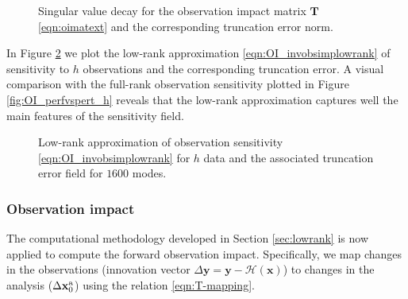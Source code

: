 \documentclass[final,sort&compress]{elsarticle}
\newcommand{\T}{\mathbf{T}}
\newcommand{\x}{   \mathbf{x} }
\newcommand{\xa}{ \mathbf{x}^{\rm a} }
\newcommand{\y}{ \mathbf{y} }
\renewcommand{\H}{\mathcal{H}}
\begin{document}
 \begin{figure}
 \setcounter{subfigure}{0}
  \centering
  \caption{Singular value decay for the observation impact matrix $\T$ \eqref{eqn:oimatext} and the corresponding truncation error norm.}
  \label{fig:lowrank}
 \end{figure}

In Figure \ref{fig:OI_redrank} we plot the low-rank approximation \eqref{eqn:OI_invobsimplowrank} of sensitivity to $h$ observations and the corresponding truncation error.
A visual comparison with the full-rank observation sensitivity plotted in Figure \ref{fig:OI_perfvspert_h} reveals that 
the low-rank approximation captures well the main features of the sensitivity field.

 \begin{figure}
 \setcounter{subfigure}{0}
  \centering
  \caption{Low-rank approximation of observation sensitivity \eqref{eqn:OI_invobsimplowrank} for $h$ data and the associated truncation error field for $1600$ modes.}
  \label{fig:OI_redrank}
 \end{figure}

\subsubsection{Observation impact}

The computational methodology developed in Section \ref{sec:lowrank} is now applied
to compute the forward observation impact. Specifically, we map changes
in the observations (innovation vector $\Delta \y = \y - \H(\x)$) to changes
in the analysis ($\Delta \xa_0$) using the relation \eqref{eqn:T-mapping}.
\end{document}

